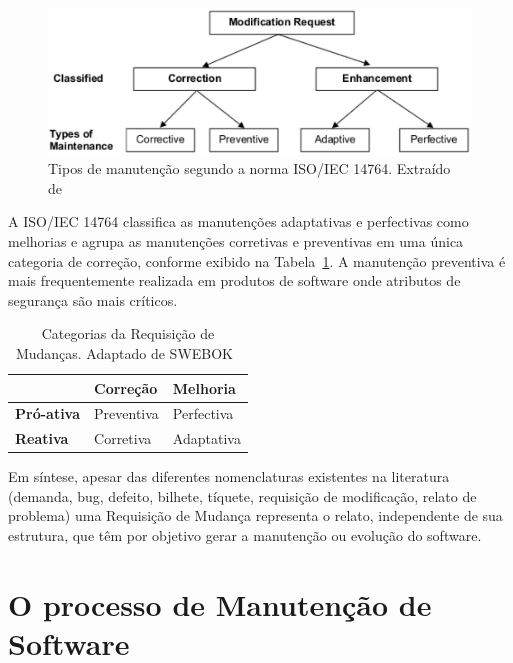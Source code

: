 \begin{figure}[hbtp] \centering \includegraphics[width=.75\textwidth]
	{chapter-intro/img/modification_request.eps} \caption{Tipos de manutenção
		segundo a norma ISO/IEC 14764. Extraído de~\cite{1703974}}
	\label{fig:modification-request} \end{figure}

A ISO/IEC 14764 classifica as manutenções adaptativas e perfectivas como
melhorias e agrupa as manutenções corretivas e preventivas em uma única
categoria de correção, conforme exibido na
Tabela~\ref{tab:categorias_requisicao_mudanca}. A manutenção preventiva é mais
frequentemente realizada em produtos de software onde atributos de segurança são
mais críticos.

\begin{table}[htpb] \centering 	\begin{tabular}{l|l|l|} \cline{2-3} &
		\textbf{Correção} & \textbf{Melhoria} \\ \hline
		\multicolumn{1}{|l|}{\textbf{Pró-ativa}} & Preventiva & Perfectiva \\
		\hline \multicolumn{1}{|l|}{\textbf{Reativa}} & Corretiva & Adaptativa
		\\ \hline \end{tabular}\caption{Categorias da Requisição de Mudanças.
		Adaptado de
		SWEBOK~\cite{4425813}}\label{tab:categorias_requisicao_mudanca}
\end{table}

Em síntese, apesar das diferentes nomenclaturas existentes na literatura
(demanda, bug, defeito, bilhete, tíquete, requisição de modificação, relato de
problema) uma Requisição de Mudança representa o relato, independente de sua
estrutura, que têm por objetivo gerar a manutenção ou evolução do software.

\section{O processo de Manutenção de Software}
 \label{sec:o_processo_de_manutecao_de_software}


